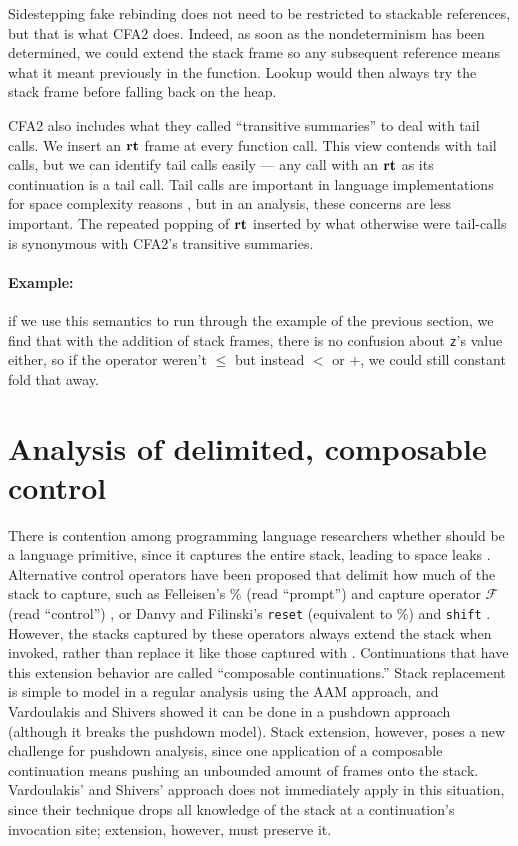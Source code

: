 \documentclass{llncs}
\newcommand{\Scribtexttt}[1]{{\texttt{#1}}}
\newcommand{\SColorize}[2]{\color{#1}{#2}}
\newcommand{\inColor}[2]{{\Scribtexttt{\SColorize{#1}{#2}}}}
\newcommand{\rackett}[1]{\inColor{black}{#1}}
\begin{document}
Sidestepping fake rebinding does not need to be restricted to
stackable references, but that is what CFA2 does. Indeed, as soon as
the nondeterminism has been determined, we could extend the stack
frame so any subsequent reference means what it meant previously in
the function. Lookup would then always try the stack frame before
falling back on the heap.

CFA2 also includes what they called ``transitive summaries'' to deal
with tail calls. We insert an $\mathbf{rt}$ frame at every function call.
This view contends with tail calls, but we can identify tail calls
easily --- any call with an $\mathbf{rt}$ as its continuation is a tail
call. Tail calls are important in language implementations for space
complexity reasons \citep{ianjohnson:clinger:tail-calls:1998}, but in
an analysis, these concerns are less important. The repeated popping
of $\mathbf{rt}$ inserted by what otherwise were tail-calls is synonymous with
CFA2's transitive summaries.

\paragraph{Example:} if we use this semantics to run through the
example of the previous section, we find that with the addition of
stack frames, there is no confusion about \texttt{z}'s value either,
so if the operator weren't $\le$ but instead $<$ or $+$, we could
still constant fold that away.

\section{Analysis of delimited, composable control}
\label{sec:sr}

There is contention among programming language researchers whether
\rackett{call/cc} should be a language primitive, since it captures
the entire stack, leading to space leaks
\citep{ianjohnson:kiselyov:against-callcc}. Alternative control
operators have been proposed that delimit how much of the stack to
capture, such as Felleisen's $\%$ (read ``prompt'') and capture
operator ${\mathcal F}$ (read ``control'')
\citep{ianjohnson:felleisen:control:1988}, or Danvy and Filinski's
\texttt{reset} (equivalent to $\%$) and \texttt{shift}
\citep{ianjohnson:danvy:filinski:delim:1990}. However, the stacks
captured by these operators always extend the stack when invoked,
rather than replace it like those captured with
\rackett{call/cc}. Continuations that have this extension behavior are
called ``composable continuations.'' Stack replacement is simple to
model in a regular analysis using the AAM approach, and Vardoulakis
and Shivers showed it can be done in a pushdown approach (although it
breaks the pushdown model). Stack extension, however, poses a new
challenge for pushdown analysis, since one application of a composable
continuation means pushing an unbounded amount of frames onto the
stack. Vardoulakis' and Shivers' approach does not immediately apply
in this situation, since their technique drops all knowledge of the
stack at a continuation's invocation site; extension, however, must
preserve it.
\end{document}
